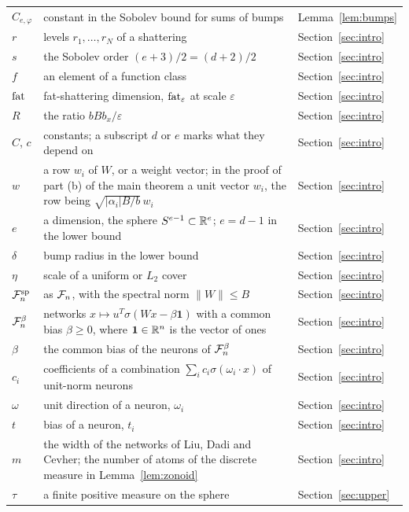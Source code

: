 {\begin{longtable}{@{}p{}p{}l@{}}
$C_{e,\varphi}$ & constant in the Sobolev bound for sums of bumps & Lemma~\ref{lem:bumps} \\
$r$ & levels $r_1,\dots,r_N$ of a shattering & Section~\ref{sec:intro} \\
$s$ & the Sobolev order $(e+3)/2=(d+2)/2$ & Section~\ref{sec:intro} \\
$f$ & an element of a function class & Section~\ref{sec:intro} \\
$\operatorname{fat}$ & fat-shattering dimension, $\operatorname{fat}_\varepsilon$ at scale $\varepsilon$ & Section~\ref{sec:intro} \\
$R$ & the ratio $bBb_x/\varepsilon$ & Section~\ref{sec:intro} \\
$C$, $c$ & constants; a subscript $d$ or $e$ marks what they depend on & Section~\ref{sec:intro} \\
$w$ & a row $w_i$ of $W$, or a weight vector; in the proof of part (b) of the main theorem a unit vector $w_i$, the row being $\sqrt{|\alpha_i|B/b}\,w_i$ & Section~\ref{sec:intro} \\
$e$ & a dimension, the sphere $S^{e-1}\subset\mathbb{R}^e$; $e=d-1$ in the lower bound & Section~\ref{sec:intro} \\
$\delta$ & bump radius in the lower bound & Section~\ref{sec:intro} \\
$\eta$ & scale of a uniform or $L_2$ cover & Section~\ref{sec:intro} \\
$\mathcal{F}_n^{\mathrm{sp}}$ & as $\mathcal{F}_n$, with the spectral norm $\|W\|\le B$ & Section~\ref{sec:intro} \\
$\mathcal{F}_n^{\beta}$ & networks $x\mapsto u^{T}\sigma(Wx-\beta\mathbf 1)$ with a common bias $\beta\ge0$, where $\mathbf 1\in\mathbb{R}^n$ is the vector of ones & Section~\ref{sec:intro} \\
$\beta$ & the common bias of the neurons of $\mathcal{F}_n^{\beta}$ & Section~\ref{sec:intro} \\
$c_i$ & coefficients of a combination $\sum_ic_i\sigma(\omega_i\cdot x)$ of unit-norm neurons & Section~\ref{sec:intro} \\
$\omega$ & unit direction of a neuron, $\omega_i$ & Section~\ref{sec:intro} \\
$t$ & bias of a neuron, $t_i$ & Section~\ref{sec:intro} \\
$m$ & the width of the networks of Liu, Dadi and Cevher; the number of atoms of the discrete measure in Lemma~\ref{lem:zonoid} & Section~\ref{sec:intro} \\
$\tau$ & a finite positive measure on the sphere & Section~\ref{sec:upper} \\

\end{longtable}}
